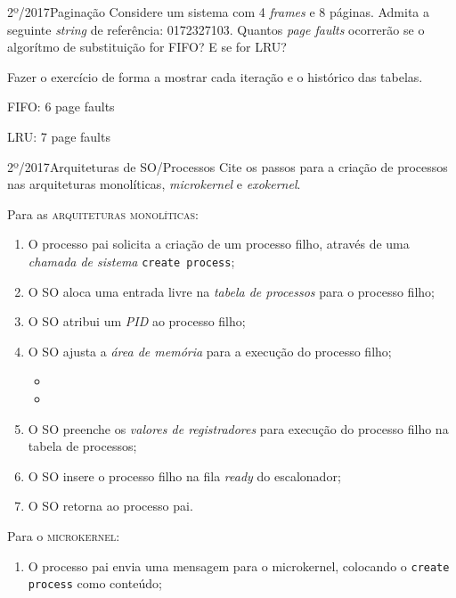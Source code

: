 \begin{exercicio}
  {2º/2017}{Paginação}
  {Considere um sistema com 4 \textit{frames} e 8 páginas. Admita a seguinte \textit{string} de referência: 0172327103. Quantos \textit{page faults} ocorrerão se o algorítmo de substituição for FIFO? E se for LRU?}

  Fazer o exercício de forma a mostrar cada iteração e o histórico das tabelas.

  FIFO: 6 page faults

  LRU: 7 page faults
\end{exercicio}

\begin{exercicio}
  {2º/2017}{Arquiteturas de SO/Processos}
  {Cite os passos para a criação de processos nas arquiteturas monolíticas, \textit{microkernel} e \textit{exokernel}.}

  Para as \textsc{arquiteturas monolíticas}:
  \begin{enumerate}
    \item O processo pai solicita a criação de um processo filho, através de uma \textit{chamada de sistema} \texttt{create process};

    \item O SO aloca uma entrada livre na \textit{tabela de processos} para o processo filho;

    \item O SO atribui um \textit{PID} ao processo filho;

    \item O SO ajusta a \textit{área de memória} para a execução do processo filho;
    \begin{itemize}
      \item %
      \item %
    \end{itemize}

    \item O SO preenche os \textit{valores de registradores} para execução do processo filho na tabela de processos;

    \item O SO insere o processo filho na fila \textit{ready} do escalonador;

    \item O SO retorna ao processo pai.
  \end{enumerate}

  Para o \textsc{microkernel}:
  \begin{enumerate}
    \item O processo pai envia uma mensagem para o microkernel, colocando o \texttt{create process} como conteúdo;


\end{enumerate}
\end{exercicio}
